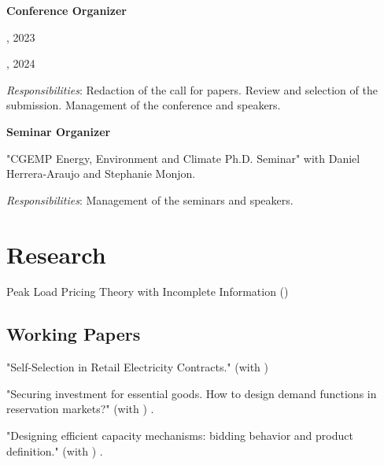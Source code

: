 \documentclass[letterpaper]{article}
\newcommand{\MYhref}[3][darkblue]{\href{#2}{\color{#1}{#3}}}%
\renewenvironment{itemize}{
  \begin{list}{}{
    \setlength{\leftmargin}{1.5em}
  }
}{
  \end{list}
}
\begin{document}
\begin{itemize}

\item \textbf{Conference Organizer}

\item \textcolor{darkcerulean}{\MYhref{https://leopoldmonjoie.com/files/Programme_PhD_Day.pdf}{"1rst CEEM Ph.D. Conference - Toward a new electricity market model?"}}, 2023

\textcolor{darkcerulean}{\MYhref{https://leopoldmonjoie.com/files/Programme_PhD_Day_2.pdf}{"2nd CEEM Ph.D. Conference - Key issues for electricity market design"}}, 2024

\textit{Responsibilities}: Redaction of the call for papers. Review and selection of the submission. Management of the conference and speakers.

\item \textbf{Seminar Organizer}
\item "CGEMP Energy, Environment and Climate Ph.D. Seminar" with Daniel Herrera-Araujo and Stephanie Monjon.

\textit{Responsibilities}: Management of the seminars and speakers.

\end{itemize}




\section*{\textbf{Research}}

\begin{itemize}
\item  {Peak Load Pricing Theory with Incomplete Information} (\textcolor{darkblue}{\MYhref{http://leopoldmonjoie.com/files/monjoie_jmp.pdf}{\textbf{JMP}}})  
\end{itemize}

\subsection*{Working Papers}

\begin{itemize}
\item "Self-Selection in Retail Electricity Contracts." (with \textcolor{darkcerulean}{\MYhref{https://www.julienduc.net/}{Julien Duc}}) 
\item "Securing investment for essential goods. How to design demand functions in reservation markets?" (with \textcolor{darkcerulean}{\MYhref{https://www.compasslexecon.com/professionals/fabien-roques}{Fabien Roques}})   \textcolor{darkblue}{\MYhref{http://leopoldmonjoie.com/files/WP_Leopold_Monjoie.pdf}{2022 CEEM Working Paper 55}}.
\item "Designing efficient capacity mechanisms: bidding behavior and product definition." (with \textcolor{darkcerulean}{\MYhref{https://www.compasslexecon.com/professionals/fabien-roques}{Fabien Roques}})  \textcolor{darkblue}{\MYhref{http://leopoldmonjoie.com/files/WP54_Designing_efficient_capacity_mechanisms_bidding_behavior_and_product_definition_.pdf}{2021 CEEM Working Paper 54}}.
\end{itemize}
\end{document}
